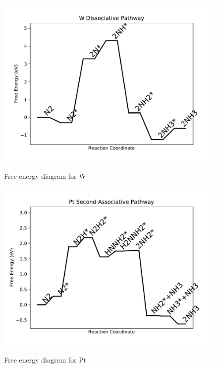 \documentclass{article}
\begin{document}
\begin{figure}
\includegraphics[width=1\linewidth]{data/plots/W_dissociative.pdf}
\label{fig:W_dissociative}
\caption{Free energy diagram for W}
\end{figure}

\clearpage
\begin{figure}
\includegraphics[width=1\linewidth]{data/plots/Pt_associative_2.pdf}
\label{fig:Pt_associative_2}
\caption{Free energy diagram for Pt}
\end{figure}
\end{document}
